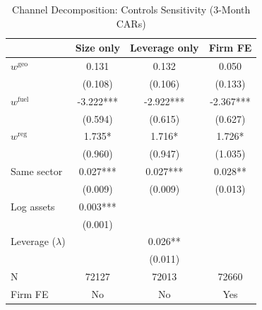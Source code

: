 \begin{table}[!htbp]
\centering
\caption{Channel Decomposition: Controls Sensitivity (3-Month CARs)}
\label{tab:channel_controls_sensitivity}
\begin{tabular}{lccc}
\toprule
 & Size only & Leverage only & Firm FE \\
\midrule
$w^{\mathrm{geo}}$ & 0.131 & 0.132 & 0.050 \\
 & (0.108) & (0.106) & (0.133) \\
$w^{\mathrm{fuel}}$ & -3.222*** & -2.922*** & -2.367*** \\
 & (0.594) & (0.615) & (0.627) \\
$w^{\mathrm{reg}}$ & 1.735* & 1.716* & 1.726* \\
 & (0.960) & (0.947) & (1.035) \\
Same sector & 0.027*** & 0.027*** & 0.028** \\
 & (0.009) & (0.009) & (0.013) \\
Log assets & 0.003*** &  &  \\
 & (0.001) &  &  \\
Leverage ($\lambda$) &  & 0.026** &  \\
 &  & (0.011) &  \\
\midrule
N & 72127 & 72013 & 72660 \\
Firm FE & No & No & Yes \\
\bottomrule
\end{tabular}
\end{table}